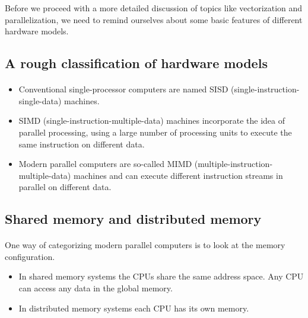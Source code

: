 \documentclass[%
oneside,                 %
final,                   %
10pt]{article}
\begin{document}
\noindent
Before we proceed with a more detailed discussion of topics like vectorization and parallelization, we need to remind ourselves about some basic features of different hardware models.



\subsection*{A rough classification of hardware models}

\paragraph{}

\begin{itemize}
\item Conventional single-processor computers are named SISD (single-instruction-single-data) machines.

\item SIMD (single-instruction-multiple-data) machines incorporate the idea of parallel processing, using a large number of processing units to execute the same instruction on different data.

\item Modern parallel computers are so-called MIMD (multiple-instruction-multiple-data) machines and can execute different instruction streams in parallel on different data.
\end{itemize}

\noindent



\subsection*{Shared memory and distributed memory}

\paragraph{}
One way of categorizing modern parallel computers is to look at the memory configuration.
\begin{itemize}
\item In shared memory systems the CPUs share the same address space. Any CPU can access any data in the global memory.

\item In distributed memory systems each CPU has its own memory.
\end{itemize}
\end{document}
